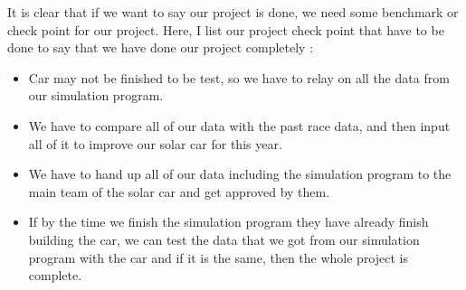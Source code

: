 \documentclass[journal, 10pt, draftclsnofoot, onecolumn]{IEEEtran}
\begin{document}
	It is clear that if we want to say our project is done, we need some benchmark or check point for our project. Here, I list our project check point that have to be done to say that we have done our project completely : 
	\begin{itemize}
		\item Car may not be finished to be test, so we have to relay on all the data from our simulation program.
		\item We have to compare all of our data with the past race data, and then input all of it to improve our solar car for this year.
		\item We have to hand up all of our data including the simulation program to the main team of the solar car and get approved by them.
		\item If by the time we finish the simulation program they have already finish building the car, we can test the data that we got from our simulation program with the car and if it is the same, then the whole project is complete. 
	\end{itemize}
	
\end{document}
